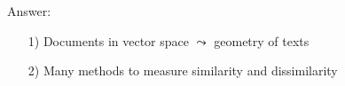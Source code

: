 \documentclass{beamer}
\numberwithin{equation}{section}
\begin{document}
\begin{frame}
Answer: \pause \\
 \pause
\begin{center}
\end{center}


\end{frame}



\begin{frame}

\begin{itemize}
\item[1)] Documents in vector space $\leadsto$ geometry of texts
\item[2)] Many methods to measure similarity and dissimilarity
\end{itemize}



\end{frame}
\end{document}
